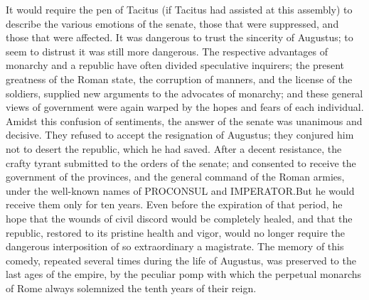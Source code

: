 It would require the pen of Tacitus (if Tacitus had assisted at
this assembly) to describe the various emotions of the senate,
those that were suppressed, and those that were affected. It was
dangerous to trust the sincerity of Augustus; to seem to distrust
it was still more dangerous. The respective advantages of
monarchy and a republic have often divided speculative inquirers;
the present greatness of the Roman state, the corruption of
manners, and the license of the soldiers, supplied new arguments
to the advocates of monarchy; and these general views of
government were again warped by the hopes and fears of each
individual. Amidst this confusion of sentiments, the answer of
the senate was unanimous and decisive. They refused to accept the
resignation of Augustus; they conjured him not to desert the
republic, which he had saved. After a decent resistance, the
crafty tyrant submitted to the orders of the senate; and
consented to receive the government of the provinces, and the
general command of the Roman armies, under the well-known names
of PROCONSUL and IMPERATOR.\footnotemark[5] But he would receive them only for
ten years. Even before the expiration of that period, he hope
that the wounds of civil discord would be completely healed, and
that the republic, restored to its pristine health and vigor,
would no longer require the dangerous interposition of so
extraordinary a magistrate. The memory of this comedy, repeated
several times during the life of Augustus, was preserved to the
last ages of the empire, by the peculiar pomp with which the
perpetual monarchs of Rome always solemnized the tenth years of
their reign.\footnotemark[6]



